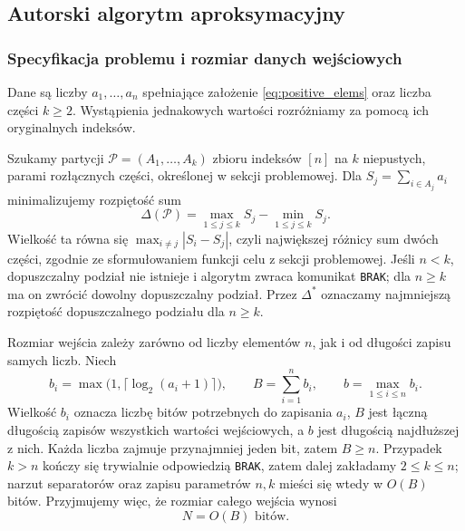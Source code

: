 \documentclass[11pt]{article}
\begin{document}
\subsection{Autorski algorytm aproksymacyjny}

\subsubsection{Specyfikacja problemu i rozmiar danych wejściowych}

Dane są liczby $a_1,\ldots,a_n$ spełniające założenie \eqref{eq:positive_elems} oraz liczba części $k\geq 2$. Wystąpienia jednakowych wartości rozróżniamy za pomocą ich oryginalnych indeksów. 

Szukamy partycji $\mathcal{P}=(A_1,\ldots,A_k)$ zbioru indeksów $[n]$ na $k$ niepustych, parami rozłącznych części, określonej w sekcji problemowej. Dla $S_j=\sum_{i\in A_j}a_i$ minimalizujemy rozpiętość sum
\begin{equation}
  \Delta(\mathcal{P})=\max_{1\leq j\leq k}S_j-\min_{1\leq j\leq k}S_j.
\end{equation}
Wielkość ta równa się $\max_{i\neq j}|S_i-S_j|$, czyli największej różnicy sum dwóch części, zgodnie ze sformułowaniem funkcji celu z sekcji problemowej. Jeśli $n<k$, dopuszczalny podział nie istnieje i algorytm zwraca komunikat \texttt{BRAK}; dla $n\geq k$ ma on zwrócić dowolny dopuszczalny podział. Przez $\Delta^*$ oznaczamy najmniejszą rozpiętość dopuszczalnego podziału dla $n\geq k$.

Rozmiar wejścia zależy zarówno od liczby elementów $n$, jak i od długości zapisu samych liczb. Niech
\begin{equation}
  b_i=\max\bigl(1,\lceil\log_2(a_i+1)\rceil\bigr),\qquad
  B=\sum_{i=1}^{n}b_i,\qquad
  b=\max_{1\leq i\leq n}b_i.
\end{equation}
Wielkość $b_i$ oznacza liczbę bitów potrzebnych do zapisania $a_i$, $B$ jest łączną długością zapisów wszystkich wartości wejściowych, a $b$ jest długością najdłuższej z nich. Każda liczba zajmuje przynajmniej jeden bit, zatem $B\geq n$. Przypadek $k>n$ kończy się trywialnie odpowiedzią \texttt{BRAK}, zatem dalej zakładamy $2\leq k\leq n$; narzut separatorów oraz zapisu parametrów $n,k$ mieści się wtedy w $O(B)$ bitów. Przyjmujemy więc, że rozmiar całego wejścia wynosi
\begin{equation}
  N=O(B)\text{ bitów}.
\end{equation}
\end{document}
